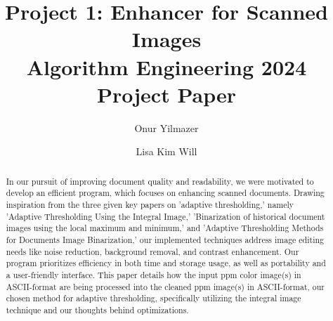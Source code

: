 \documentclass[sigconf]{acmart}
\begin{document}
\title[Project 1: Enhancer for Scanned Images]{Project 1: Enhancer for Scanned Images\\\large Algorithm Engineering 2024 Project Paper}


\author{Onur Yilmazer}

\author{Lisa Kim Will}


\begin{abstract}

In our pursuit of improving document quality and readability, we were motivated to develop an efficient program, which focuses on enhancing scanned documents. Drawing inspiration from the three given key papers on 'adaptive thresholding,' namely 'Adaptive Thresholding Using the Integral Image,' 'Binarization of historical document images using the local maximum and minimum,' and 'Adaptive Thresholding Methods for Documents Image Binarization,' our implemented techniques address image editing needs like noise reduction, background removal, and contrast enhancement. Our program prioritizes efficiency in both time and storage usage, as well as portability and a user-friendly interface. This paper details how the input ppm color image(s) in ASCII-format are being processed into the cleaned ppm image(s) in ASCII-format, our chosen method for adaptive thresholding, specifically utilizing the integral image technique and our thoughts behind optimizations.



\end{abstract}



\maketitle
\end{document}
